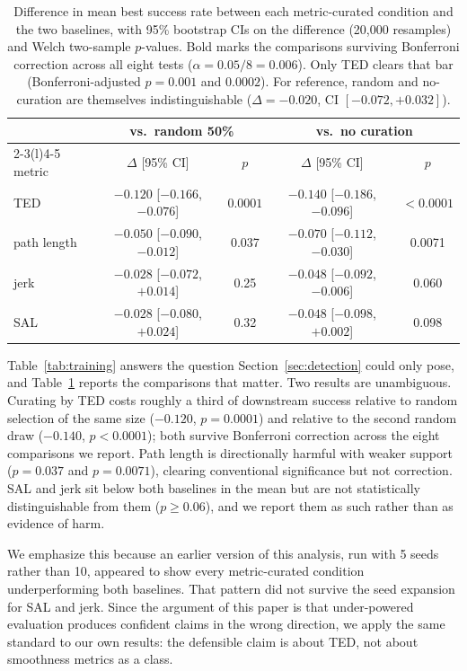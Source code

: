 \documentclass{article}
\begin{document}
\begin{table}[t]
\centering
\small
\begin{tabular}{lcccc}
\toprule
& \multicolumn{2}{c}{vs.\ random 50\%} & \multicolumn{2}{c}{vs.\ no curation} \\
\cmidrule(lr){2-3}\cmidrule(l){4-5}
metric & $\Delta$ [95\% CI] & $p$ & $\Delta$ [95\% CI] & $p$ \\
\midrule
TED         & $-0.120$ [$-0.166$, $-0.076$] & $\mathbf{0.0001}$ & $-0.140$ [$-0.186$, $-0.096$] & $\mathbf{<0.0001}$ \\
path length & $-0.050$ [$-0.090$, $-0.012$] & 0.037 & $-0.070$ [$-0.112$, $-0.030$] & 0.0071 \\
jerk        & $-0.028$ [$-0.072$, $+0.014$] & 0.25 & $-0.048$ [$-0.092$, $-0.006$] & 0.060 \\
SAL         & $-0.028$ [$-0.080$, $+0.024$] & 0.32 & $-0.048$ [$-0.098$, $+0.002$] & 0.098 \\
\bottomrule
\end{tabular}
\caption{Difference in mean best success rate between each metric-curated
condition and the two baselines, with 95\% bootstrap CIs on the difference
(20{,}000 resamples) and Welch two-sample $p$-values. Bold marks the
comparisons surviving Bonferroni correction across all eight tests
($\alpha = 0.05/8 = 0.006$). Only TED clears that bar (Bonferroni-adjusted $p = 0.001$ and $0.0002$). For reference,
random and no-curation are themselves indistinguishable
($\Delta = -0.020$, CI $[-0.072, +0.032]$).}
\label{tab:tests}
\end{table}

Table~\ref{tab:training} answers the question Section~\ref{sec:detection}
could only pose, and Table~\ref{tab:tests} reports the comparisons that
matter. Two results are unambiguous. Curating by TED costs roughly a third
of downstream success relative to random selection of the same size
($-0.120$, $p = 0.0001$) and relative to the second random draw ($-0.140$,
$p < 0.0001$); both survive Bonferroni correction across the eight
comparisons we report. Path length is directionally harmful with weaker
support ($p = 0.037$ and $p = 0.0071$), clearing conventional significance
but not correction. SAL and jerk sit below both baselines in the mean but
are not statistically distinguishable from them ($p \geq 0.06$), and we
report them as such rather than as evidence of harm.

We emphasize this because an earlier version of this analysis, run with
5 seeds rather than 10, appeared to show every metric-curated condition
underperforming both baselines. That pattern did not survive the seed
expansion for SAL and jerk. Since the argument of this paper is that
under-powered evaluation produces confident claims in the wrong direction,
we apply the same standard to our own results: the defensible claim is about
TED, not about smoothness metrics as a class.
\end{document}
